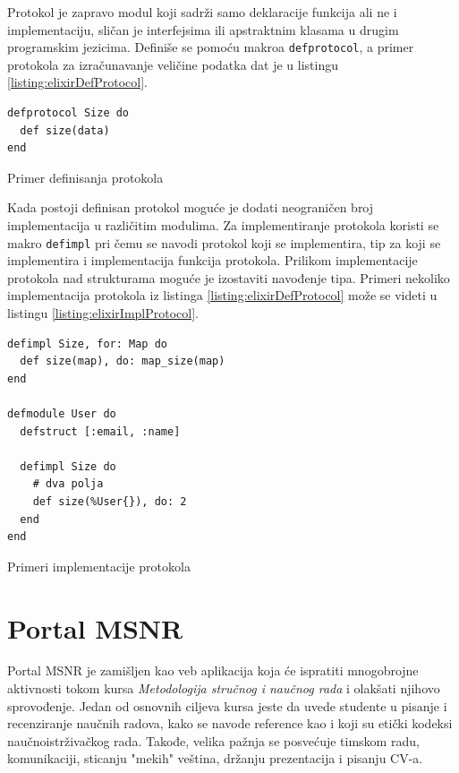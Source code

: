 \documentclass[12pt,oneside]{memoir}
\begin{document}
Protokol je zapravo modul koji sadrži samo deklaracije funkcija ali ne i implementaciju,
sličan je interfejsima ili apstraktnim klasama u drugim programskim jezicima. Definiše se
pomoću makroa \texttt{defprotocol}, a primer protokola za izračunavanje veličine podatka dat
je u listingu \ref{listing:elixirDefProtocol}.
\begin{listing}[!ht]
\begin{verbatim}
defprotocol Size do
  def size(data)
end
\end{verbatim}
\caption{Primer definisanja protokola}
\label{listing:elixirDefProtocol}
\end{listing}
Kada postoji definisan protokol moguće je dodati neograničen broj implementacija u
različitim modulima. Za implementiranje protokola koristi se makro \texttt{defimpl} pri čemu
se navodi protokol koji se implementira, tip za koji se implementira i implementacija funkcija protokola.
Prilikom implementacije protokola nad strukturama moguće je izostaviti navođenje tipa.
Primeri nekoliko implementacija protokola iz listinga \ref{listing:elixirDefProtocol} može se videti u
listingu \ref{listing:elixirImplProtocol}.
\begin{listing}[!ht]
\begin{verbatim}
defimpl Size, for: Map do
  def size(map), do: map_size(map)
end

defmodule User do
  defstruct [:email, :name]

  defimpl Size do
    # dva polja
    def size(%User{}), do: 2
  end
end
\end{verbatim}
\caption{Primeri implementacije protokola}
\label{listing:elixirImplProtocol}
\end{listing}

\chapter{Portal MSNR}
Portal MSNR je zamišljen kao veb aplikacija koja će ispratiti mnogobrojne aktivnosti tokom kursa \emph{Metodologija stručnog i naučnog rada} i olakšati njihovo sprovođenje.
Jedan od osnovnih ciljeva kursa jeste da uvede studente u pisanje i recenziranje naučnih radova, kako se navode reference kao i koji su etički kodeksi naučnoistrživačkog rada.
Takođe, velika pažnja se posvećuje timskom radu, komunikaciji, sticanju "mekih" veština, držanju prezentacija i pisanju CV-a.
\end{document}
